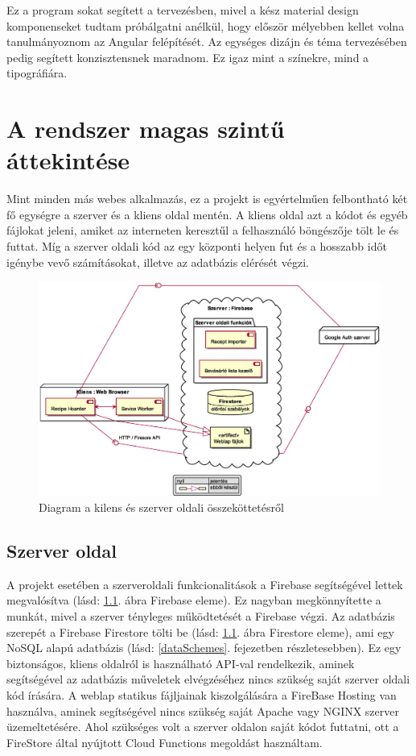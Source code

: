 \documentclass[12pt]{report}
\theoremstyle{definition}
\begin{document}
Ez a program sokat segített a tervezésben, mivel a kész material design komponenseket tudtam próbálgatni anélkül, hogy először mélyebben kellet volna tanulmányoznom az Angular felépítését. Az egységes dizájn és téma tervezésében pedig segített konzisztensnek maradnom. Ez igaz mint a színekre, mind a tipográfiára.


\chapter{A rendszer magas szintű áttekintése}
\label{systemExplanation}
Mint minden más webes alkalmazás, ez a projekt is egyértelműen felbontható két fő egységre a szerver és a kliens oldal mentén. A kliens oldal azt a kódot és egyéb fájlokat jeleni, amiket az interneten keresztűl a felhasználó böngészője tölt le és futtat. Míg a szerver oldali kód az egy központi helyen fut és a hosszabb időt igénybe vevő számításokat, illetve az adatbázis elérését végzi.

\noindent
\begin{figure}[H]
	\centering
	\includegraphics[width=\textwidth]{out/diagrams/deployment/deployment.eps}
	\caption{Diagram a kilens és szerver oldali összeköttetésről}
    \label{fig:deployment}
\end{figure}

\section{Szerver oldal}
A projekt esetében a szerveroldali funkcionalitások a Firebase segítségével lettek megvalósítva (lásd: \ref{fig:deployment}. ábra Firebase eleme). Ez nagyban megkönnyítette a munkát, mivel a szerver tényleges működtetését a Firebase végzi. Az adatbázis szerepét a Firebase Firestore tölti be (lásd: \ref{fig:deployment}.  ábra Firestore eleme), ami egy NoSQL alapú adatbázis (lásd: \ref{dataSchemes}. fejezetben részletesebben).  Ez egy biztonságos, kliens oldalról is használható API-val rendelkezik, aminek segítségével az adatbázis műveletek elvégzéséhez nincs szükség saját szerver oldali kód írására. A weblap statikus fájljainak kiszolgálására a FireBase Hosting van használva, aminek segítségével nincs szükség saját Apache vagy NGINX szerver üzemeltetésére. Ahol szükséges volt a szerver oldalon saját kódot futtatni, ott a FireStore által nyújtott Cloud Functions megoldást használtam.
\end{document}
